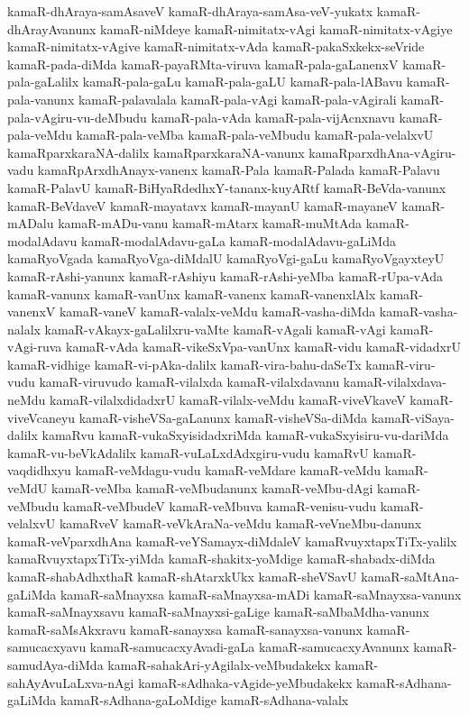 {kamaR-dhAraya-samAsaveV
kamaR-dhAraya-samAsa-veV-yukatx
kamaR-dhArayAvanunx
kamaR-niMdeye
kamaR-nimitatx-vAgi
kamaR-nimitatx-vAgiye
kamaR-nimitatx-vAgive
kamaR-nimitatx-vAda
kamaR-pakaSxkekx-seVride
kamaR-pada-diMda
kamaR-payaRMta-viruva
kamaR-pala-gaLanenxV
kamaR-pala-gaLalilx
kamaR-pala-gaLu
kamaR-pala-gaLU
kamaR-pala-lABavu
kamaR-pala-vanunx
kamaR-palavalala
kamaR-pala-vAgi
kamaR-pala-vAgirali
kamaR-pala-vAgiru-vu-deMbudu
kamaR-pala-vAda
kamaR-pala-vijAcnxnavu
kamaR-pala-veMdu
kamaR-pala-veMba
kamaR-pala-veMbudu
kamaR-pala-velalxvU
kamaRparxkaraNA-dalilx
kamaRparxkaraNA-vanunx
kamaRparxdhAna-vAgiru-vadu
kamaRpArxdhAnayx-vanenx
kamaR-Pala
kamaR-Palada
kamaR-Palavu
kamaR-PalavU
kamaR-BiHyaRdedhxY-tananx-kuyARtf
kamaR-BeVda-vanunx
kamaR-BeVdaveV
kamaR-mayatavx
kamaR-mayanU
kamaR-mayaneV
kamaR-mADalu
kamaR-mADu-vanu
kamaR-mAtarx
kamaR-muMtAda
kamaR-modalAdavu
kamaR-modalAdavu-gaLa
kamaR-modalAdavu-gaLiMda
kamaRyoVgada
kamaRyoVga-diMdalU
kamaRyoVgi-gaLu
kamaRyoVgayxteyU
kamaR-rAshi-yanunx
kamaR-rAshiyu
kamaR-rAshi-yeMba
kamaR-rUpa-vAda
kamaR-vanunx
kamaR-vanUnx
kamaR-vanenx
kamaR-vanenxlAlx
kamaR-vanenxV
kamaR-vaneV
kamaR-valalx-veMdu
kamaR-vasha-diMda
kamaR-vasha-nalalx
kamaR-vAkayx-gaLalilxru-vaMte
kamaR-vAgali
kamaR-vAgi
kamaR-vAgi-ruva
kamaR-vAda
kamaR-vikeSxVpa-vanUnx
kamaR-vidu
kamaR-vidadxrU
kamaR-vidhige
kamaR-vi-pAka-dalilx
kamaR-vira-bahu-daSeTx
kamaR-viru-vudu
kamaR-viruvudo
kamaR-vilalxda
kamaR-vilalxdavanu
kamaR-vilalxdava-neMdu
kamaR-vilalxdidadxrU
kamaR-vilalx-veMdu
kamaR-viveVkaveV
kamaR-viveVcaneyu
kamaR-visheVSa-gaLanunx
kamaR-visheVSa-diMda
kamaR-viSaya-dalilx
kamaRvu
kamaR-vukaSxyisidadxriMda
kamaR-vukaSxyisiru-vu-dariMda
kamaR-vu-beVkAdalilx
kamaR-vuLaLxdAdxgiru-vudu
kamaRvU
kamaR-vaqdidhxyu
kamaR-veMdagu-vudu
kamaR-veMdare
kamaR-veMdu
kamaR-veMdU
kamaR-veMba
kamaR-veMbudanunx
kamaR-veMbu-dAgi
kamaR-veMbudu
kamaR-veMbudeV
kamaR-veMbuva
kamaR-venisu-vudu
kamaR-velalxvU
kamaRveV
kamaR-veVkAraNa-veMdu
kamaR-veVneMbu-danunx
kamaR-veVparxdhAna
kamaR-veYSamayx-diMdaleV
kamaRvuyxtapxTiTx-yalilx
kamaRvuyxtapxTiTx-yiMda
kamaR-shakitx-yoMdige
kamaR-shabadx-diMda
kamaR-shabAdhxthaR
kamaR-shAtarxkUkx
kamaR-sheVSavU
kamaR-saMtAna-gaLiMda
kamaR-saMnayxsa
kamaR-saMnayxsa-mADi
kamaR-saMnayxsa-vanunx
kamaR-saMnayxsavu
kamaR-saMnayxsi-gaLige
kamaR-saMbaMdha-vanunx
kamaR-saMsAkxravu
kamaR-sanayxsa
kamaR-sanayxsa-vanunx
kamaR-samucacxyavu
kamaR-samucacxyAvadi-gaLa
kamaR-samucacxyAvanunx
kamaR-samudAya-diMda
kamaR-sahakAri-yAgilalx-veMbudakekx
kamaR-sahAyAvuLaLxva-nAgi
kamaR-sAdhaka-vAgide-yeMbudakekx
kamaR-sAdhana-gaLiMda
kamaR-sAdhana-gaLoMdige
kamaR-sAdhana-valalx
}
